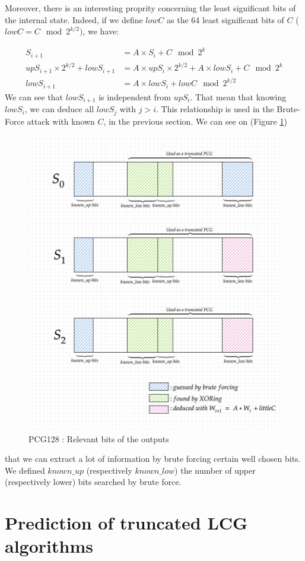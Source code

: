 \documentclass[preprint]{iacrtrans}
\begin{document}
Moreover, there is an interesting proprity concerning the least significant bits of the internal state. Indeed, if we define $lowC$ as the 64 least significant bits of $C$ ($lowC = C \mod{2^{k/2}})$, we have:

\begin{align}
    S_{i+1} &= A \times S_i + C \mod{2^k}\\
    upS_{i+1} \times 2^{k/2} + lowS_{i+1} &= A \times upS_i \times 2^{k/2} + A \times lowS_i + C \mod{2^k} \\
    lowS_{i+1} &= A \times lowS_i + lowC \mod 2^{k/2}
\end{align}
We can see that $lowS_{i+1}$ is independent from $upS_i$. That mean that knowing $lowS_i$, we can deduce all $lowS_j$ with $j>i$. This relationship is used in the Brute-Force attack with known $C$, in the previous section.
We can see on (Figure \ref{pcg128goodbits})%
\begin{figure}[h!]
    \centering
    \includegraphics[width=0.70\linewidth]{pictures/deducingPCG128.png}
    \caption{PCG128 : Relevant bits of the outputs}
    \label{pcg128goodbits}
\end{figure}
that we can extract a lot of information by brute forcing certain well chosen bits. We defined $known\_up$ (respectively $known\_low$) the number of upper (respectively lower) bits searched by brute force.
\newpage

\section{Prediction of truncated LCG algorithms}
\end{document}
